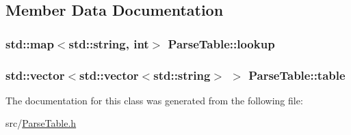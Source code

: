 \subsection{\-Member \-Data \-Documentation}
\hypertarget{classParseTable_ac91766c673d5b534e370e31eb71f6604}{
\subsubsection[{lookup}]{\setlength{\rightskip}{0pt plus 5cm}std\-::map$<$std\-::string, int$>$ {\bf \-Parse\-Table\-::lookup}}}\label{d9/da1/classParseTable_ac91766c673d5b534e370e31eb71f6604}
\hypertarget{classParseTable_a0dbd87ee0d018de6bb990e1ffd8ac26d}{
\subsubsection[{table}]{\setlength{\rightskip}{0pt plus 5cm}std\-::vector$<$std\-::vector$<$std\-::string$>$ $>$ {\bf \-Parse\-Table\-::table}}}\label{d9/da1/classParseTable_a0dbd87ee0d018de6bb990e1ffd8ac26d}


\-The documentation for this class was generated from the following file\-:\begin{DoxyCompactItemize}
\item 
src/\hyperlink{ParseTable_8h}{\-Parse\-Table.\-h}\end{DoxyCompactItemize}
